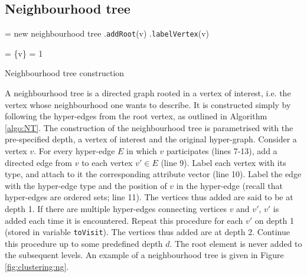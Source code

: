 \subsection{Neighbourhood tree}
\label{sec:NT}



\begin{algorithm}[t]
\SetAlgoLined
{}
 \NT = new neighbourhood tree\;
 \NT.\texttt{addRoot}(v)\;
 \NT.\texttt{labelVertex}(v) 

 \Tovisit = \{v\} 
 \D = 1 

 \caption{Neighbourhood tree construction}
 \label{algo:NT}
\end{algorithm}


A neighbourhood tree is a directed graph rooted in a vertex of interest, i.e. the vertex whose neighbourhood one wants to describe.
It is constructed simply by following the hyper-edges from the root vertex, as outlined in Algorithm \ref{algo:NT}.
The construction of the neighbourhood tree is parametrised with the pre-specified depth, a vertex of interest and the original hyper-graph.
Consider a vertex $v$.
For every hyper-edge $E$ in which $v$ participates (lines 7-13), add a directed edge from $v$ to each vertex $v' \in E$ (line 9).
Label each vertex with its type, and attach to it the corresponding attribute vector (line 10).
Label the edge with the hyper-edge type and the position of $v$ in the hyper-edge (recall that hyper-edges are ordered sets; line 11).
The vertices thus added are said to be at depth 1.
If there are multiple hyper-edges connecting vertices $v$ and $v'$, $v'$ is added each time it is encountered.
Repeat this procedure for each $v'$ on depth 1 (stored in variable \texttt{toVisit}).
The vertices thus added are at depth 2.
Continue this procedure up to some predefined depth $d$.
The root element is never added to the subsequent levels.
An example of a neighbourhood tree is given in Figure \ref{fig:clustering:ng}.


